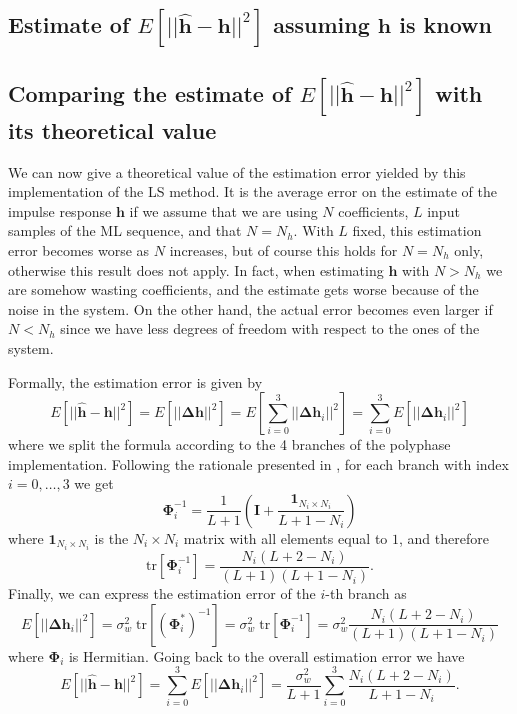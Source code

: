 \documentclass[10pt]{article}
\newcommand{\tr} {\mathrm{tr}}
\numberwithin{equation}{section}
\begin{document}
\subsection*{Estimate of $E[||\mathbf{\hat{h}}-\mathbf{h}||^2]$ assuming $\mathbf{h}$ is known}

\subsection*{Comparing the estimate of $E[||\mathbf{\hat{h}}-\mathbf{h}||^2]$ with its theoretical value}

We can now give a theoretical value of the estimation error yielded by this implementation of the LS method. It is the average error on the estimate of the impulse response $\mathbf{h}$ if we assume that we are using $N$ coefficients, $L$ input samples of the ML sequence, and that $N=N_h$. With $L$ fixed, this estimation error becomes worse as $N$ increases, but of course this holds for $N=N_h$ only, otherwise this result does not apply. In fact, when estimating $\mathbf{h}$ with $N>N_h$ we are somehow wasting coefficients, and the estimate gets worse because of the noise in the system. On the other hand, the actual error becomes even larger if $N<N_h$ since we have less degrees of freedom with respect to the ones of the system.

Formally, the estimation error is given by
\begin{equation}
	E[||\mathbf{\hat{h}}-\mathbf{h}||^2] = E[||\mathbf{\Delta h}||^2] = E[\sum_{i=0}^{3} ||\mathbf{\Delta h}_i||^2] = \sum_{i=0}^{3} E[||\mathbf{\Delta h}_i||^2]
\end{equation}
where we split the formula according to the 4 branches of the polyphase implementation. Following the rationale presented in \cite{bc}, for each branch with index $i=0,\ldots,3$ we get
\begin{equation}
	\mathbf{\Phi}_i^{-1} = \frac{1}{L+1} \left( \mathbf{I} + \frac{\mathbf{1}_{N_i \times N_i}}{L+1-N_i} \right)
\end{equation}
where $\mathbf{1}_{N_i \times N_i}$ is the $N_i \times N_i$ matrix with all elements equal to $1$, and therefore
\begin{equation}
	\tr [\mathbf{\Phi}_i^{-1}] = \frac{N_i(L+2-N_i)}{(L+1)(L+1-N_i)}.
\end{equation}
Finally, we can express the estimation error of the $i$-th branch as
\begin{equation}
	E[||\mathbf{\Delta h}_i||^2] = \sigma_w^2 \; \tr [(\mathbf{\Phi}_i^*)^{-1}] = \sigma_w^2 \; \tr [\mathbf{\Phi}_i^{-1}] = \sigma_w^2 \frac{N_i(L+2-N_i)}{(L+1)(L+1-N_i)}
\end{equation}
where $\mathbf{\Phi}_i$ is Hermitian. Going back to the overall estimation error we have
\begin{equation}
	E[||\mathbf{\hat{h}}-\mathbf{h}||^2] = \sum_{i=0}^{3} E[||\mathbf{\Delta h}_i||^2] = \frac{\sigma_w^2}{L+1} \sum_{i=0}^{3} \frac{N_i (L+2-N_i)}{L+1-N_i}.
\end{equation}
\end{document}
